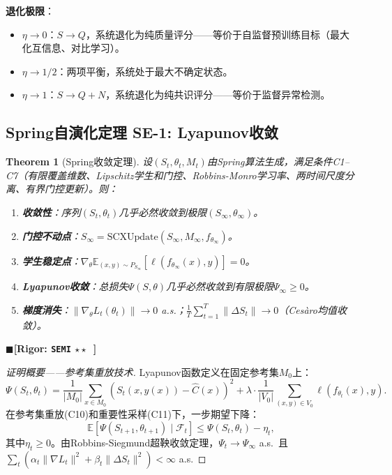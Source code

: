 \documentclass[12pt,a4paper]{ctexart}
\newtheorem{theorem}{Theorem}[section]
\theoremstyle{definition}
\theoremstyle{remark}
\newcommand{\rigorSemi}{$\blacksquare$\;\textbf{[Rigor: \texttt{SEMI} $\star\star\;\;$]}}
\begin{document}
\textbf{退化极限}：
\begin{itemize}
\item $\eta \to 0$：$S \to Q$，系统退化为纯质量评分——等价于自监督预训练目标（最大化互信息、对比学习）。
\item $\eta \to 1/2$：两项平衡，系统处于最大不确定状态。
\item $\eta \to 1$：$S \to Q + N$，系统退化为纯共识评分——等价于监督异常检测。
\end{itemize}

\subsection{Spring自演化定理 SE-1: Lyapunov收敛}

\begin{theorem}[Spring收敛定理]
\label{thm:se1}
设$(S_t, \theta_t, M_t)$由Spring算法生成，满足条件C1–C7（有限覆盖维数、Lipschitz学生和门控、Robbins-Monro学习率、两时间尺度分离、有界门控更新）。则：
\begin{enumerate}[label=(\alph*)]
\item \textbf{收敛性}：序列$(S_t, \theta_t)$几乎必然收敛到极限$(S_\infty, \theta_\infty)$。
\item \textbf{门控不动点}：$S_\infty = \text{SCXUpdate}(S_\infty, M_\infty, f_{\theta_\infty})$。
\item \textbf{学生稳定点}：$\nabla_\theta \mathbb{E}_{(x,y)\sim P_{S_\infty}}[\ell(f_{\theta_\infty}(x), y)] = 0$。
\item \textbf{Lyapunov收敛}：总损失$\Psi(S, \theta)$几乎必然收敛到有限极限$\Psi_\infty \geq 0$。
\item \textbf{梯度消失}：$\|\nabla_\theta L_t(\theta_t)\| \to 0$ a.s.；$\frac{1}{T}\sum_{t=1}^{T}\|\Delta S_t\| \to 0$（Ces\`{a}ro均值收敛）。
\end{enumerate}
\end{theorem}
\rigorSemi

\begin{proof}[证明概要——参考集重放技术]
Lyapunov函数定义在固定参考集$M_0$上：
\begin{equation}
\Psi(S_t, \theta_t) = \frac{1}{|M_0|}\sum_{x\in M_0}(S_t(x, y(x)) - \hat{C}(x))^2 + \lambda \cdot \frac{1}{|V_0|}\sum_{(x,y)\in V_0}\ell(f_{\theta_t}(x), y).
\end{equation}
在参考集重放(C10)和重要性采样(C11)下，一步期望下降：
\begin{equation}
\mathbb{E}[\Psi(S_{t+1}, \theta_{t+1})\mid\mathcal{F}_t] \leq \Psi(S_t, \theta_t) - \eta_t,
\end{equation}
其中$\eta_t \geq 0$。由Robbins-Siegmund超鞅收敛定理，$\Psi_t \to \Psi_\infty$ a.s.\ 且$\sum_t (\alpha_t\|\nabla L_t\|^2 + \beta_t\|\Delta S_t\|^2) < \infty$ a.s.
\end{proof}
\end{document}
